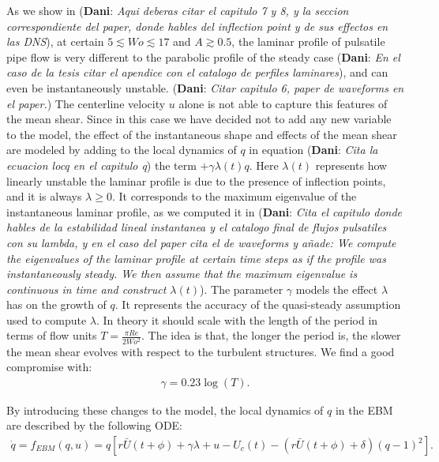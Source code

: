 \documentclass{article}
\DeclareRobustCommand{\dm}[1]{{\color{blue}(\textbf{Dani}: \textit{#1}\xspace)}}
\begin{document}
As we show in \dm{Aqui deberas citar el capitulo 7 y 8, y la seccion correspondiente del paper, donde hables del inflection point y de sus effectos en las DNS}, at certain $5 \lesssim Wo \lesssim 17$ and $A\gtrsim 0.5$, the laminar profile of pulsatile pipe flow is very different to the parabolic profile of the steady case \dm{En el caso de la tesis citar el apendice con el catalogo de perfiles laminares}, and can even be instantaneously unstable. \dm{Citar capitulo 6, paper de waveforms en el paper.} The centerline velocity $u$ alone is not able to capture this features of the mean shear. Since in this case we have decided not to add any new variable to the model, the effect of the instantaneous shape and effects of the mean shear are modeled by adding to the local dynamics of $q$ in equation \dm{Cita la ecuacion locq en el capitulo q} the term $+ \gamma \lambda \left(t\right) q$. Here $\lambda \left(t\right)$ represents how linearly unstable the laminar profile is due to the presence of inflection points, and it is always $\lambda\geq 0$. It corresponds to the maximum eigenvalue of the instantaneous laminar profile, as we computed it in \dm{Cita el capitulo donde hables de la estabilidad lineal instantanea y el catalogo final de flujos pulsatiles con su lambda, y en el caso del paper cita el de waveforms y añade: We compute the eigenvalues of the laminar profile at certain time steps as if the profile was instantaneously steady. We then assume that the maximum eigenvalue is continuous in time and construct $\lambda \left(t \right)$}. The parameter $\gamma$ models the effect $\lambda$ has on the growth of $q$. It represents the accuracy of the quasi-steady assumption used to compute $\lambda$. In theory it should scale with the length of the period in terms of flow units $T=\frac{\pi Re}{2 Wo^{2}}$. The idea is that, the longer the period is, the slower the mean shear evolves with respect to the turbulent structures. We find a good compromise with:
\begin{align}
\gamma = 0.23 \log \left(T\right) \text{.}
\label{eq:gamma_EBM}
\end{align}

By introducing these changes to the model, the local dynamics of $q$ in the EBM are described by the following ODE:
\begin{align}
\dot{q}=f_{EBM}\left(q,u\right)=q \left[r\bar{U}\left(t+\phi\right)+\gamma \lambda + u-U_{c}\left(t\right)-\left(r\bar{U}\left(t+\phi\right)+\delta \right) \left(q -1 \right)^{2} \right]\text{.}
\label{eq:loc_q_EBM}
\end{align}
\end{document}
